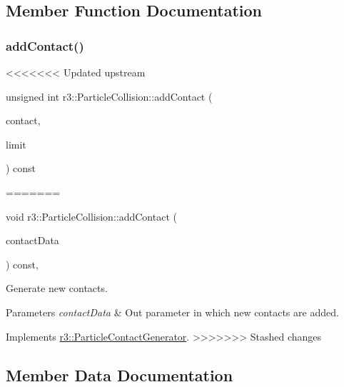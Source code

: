 \subsection{Member Function Documentation}
\mbox{\label{classr3_1_1_particle_collision_adb77c85cb90707073e7c654acb2e6719}} 
\subsubsection{\texorpdfstring{add\+Contact()}{addContact()}}
<<<<<<< Updated upstream
{\footnotesize\ttfamily unsigned int r3\+::\+Particle\+Collision\+::add\+Contact (\begin{DoxyParamCaption}\item[{\mbox{\hyperlink{classr3_1_1_particle_contact}{Particle\+Contact}} $\ast$}]{contact,  }\item[{unsigned}]{limit }\end{DoxyParamCaption}) const\hspace{0.3cm}{\ttfamily [override]}}
=======
{\footnotesize\ttfamily void r3\+::\+Particle\+Collision\+::add\+Contact (\begin{DoxyParamCaption}\item[{\mbox{\hyperlink{classr3_1_1_fixed_size_container}{Fixed\+Size\+Container}}$<$ \mbox{\hyperlink{classr3_1_1_particle_contact}{Particle\+Contact}} $>$ \&}]{contact\+Data }\end{DoxyParamCaption}) const\hspace{0.3cm}{\ttfamily [override]}, {\ttfamily [virtual]}}



Generate new contacts. 


\begin{DoxyParams}{Parameters}
{\em contact\+Data} & Out parameter in which new contacts are added. \\
\hline
\end{DoxyParams}


Implements \mbox{\hyperlink{classr3_1_1_particle_contact_generator_a39a7a8f0d5b31b1ca2c2ace2af8e2978}{r3\+::\+Particle\+Contact\+Generator}}.
>>>>>>> Stashed changes



\subsection{Member Data Documentation}
\mbox{\label{classr3_1_1_particle_collision_a269b3beb261aee2fbd784210025cdebf}} 
